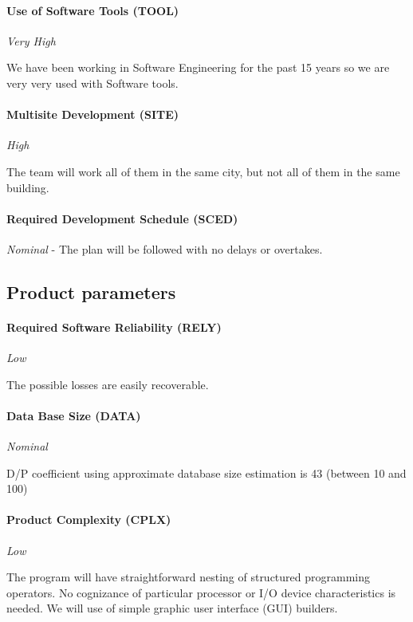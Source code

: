 \documentclass[11pt]{report}
\begin{document}
\paragraph{Use of Software Tools (TOOL) } \textit{Very High}

We have been working in Software Engineering for the past 15 years so we are very very used with Software tools.

\paragraph{Multisite Development (SITE) } \textit{High}

The team will work all of them in the same city, but not all of them in the same building.

\paragraph{Required Development Schedule (SCED) } \textit{Nominal} - The plan will be followed with no delays or overtakes. 

\subsection{Product parameters}

\paragraph{Required Software Reliability (RELY) }\textit{ Low}

The possible losses are easily recoverable.


\paragraph{Data Base Size (DATA) }\textit{ Nominal}

D/P coefficient using approximate database size estimation is 43 (between 10 and 100)


\paragraph{Product Complexity (CPLX) }\textit{ Low }

The program will have straightforward nesting of structured programming operators.  No cognizance of particular processor or I/O device characteristics is needed. We will use of simple graphic user interface (GUI) builders. 
\end{document}
